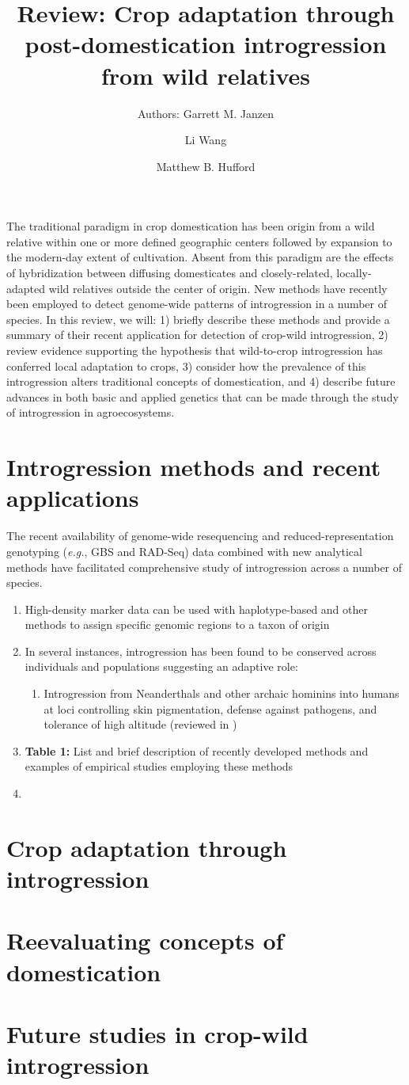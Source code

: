 \documentclass[11pt]{article}
\title{Review: Crop adaptation through post-domestication introgression from wild relatives}
\author[1]{Authors: Garrett M. Janzen}%
\author[1]{Li Wang}
\author[1,*]{Matthew B. Hufford}
\affil[1]{Department of Ecology, Evolution, and Organismal Biology, Iowa State University, Ames, Iowa, USA}
\affil[*]{Correspondence: mhufford@iastate.edu (M.B. Hufford)}
\date{}
\begin{document}
\maketitle

The traditional paradigm in crop domestication has been origin from a wild relative within one or more defined geographic centers followed by expansion to the modern-day extent of cultivation.
Absent from this paradigm are the effects of hybridization between diffusing domesticates and closely-related, locally-adapted wild relatives outside the center of origin.
New methods have recently been employed to detect genome-wide patterns of introgression in a number of species.
In this review, we will: 1) briefly describe these methods and provide a summary of their recent application for detection of crop-wild introgression, 2) review evidence supporting the hypothesis that wild-to-crop introgression has conferred local adaptation to crops, 3) consider how the prevalence of this introgression alters traditional concepts of domestication, and 4) describe future advances in both basic and applied genetics that can be made through the study of introgression in agroecosystems.

\section*{Introgression methods and recent applications}
The recent availability of genome-wide resequencing and reduced-representation genotyping (\emph{e.g.}, GBS and RAD-Seq) data combined with new analytical methods have facilitated comprehensive study of introgression across a number of species.
\begin{enumerate}
\item{High-density marker data can be used with haplotype-based and other methods to assign specific genomic regions to a taxon of origin}
\item{In several instances, introgression has been found to be conserved across individuals and populations suggesting an adaptive role:}
	\begin{enumerate}
	\item{Introgression from Neanderthals and other archaic hominins into humans at loci controlling skin pigmentation, defense against pathogens, and tolerance of high altitude (reviewed in \cite{Racimo2015}})
	\end{enumerate} 
\item{\textbf{Table 1:} List and brief description of recently developed methods and examples of empirical studies employing these methods}
\item{}
\end{enumerate}


\section*{Crop adaptation through introgression}

\section*{Reevaluating concepts of domestication}

\section*{Future studies in crop-wild introgression}

\cite{Hufford2013} \cite{Baute2015}


\end{document}
